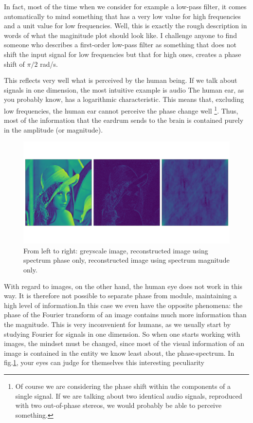 In fact, most of the time when we consider for example a low-pass filter, it comes automatically to mind something that has a very low value for 
high frequencies and a unit value for low frequencies. Well, this is exactly the rough description in words of what the maginitude plot should 
look like. I challenge anyone to find someone who describes a first-order low-pass filter as something that does not shift the input signal for 
low frequencies but that for high ones, creates a phase shift of $\pi/2$ rad/s.

This reflects very well what is perceived by the human being. If we talk about signals in one dimension, the most intuitive example is audio 
The human ear, as you probably know, has a logarithmic characteristic. This means that, excluding low frequencies, the human ear cannot 
perceive the phase change well \footnote{Of course we are considering the phase shift within the components of a single signal. 
If we are talking about two identical audio signals, reproduced with two out-of-phase stereos, we would probably be able to perceive something.}.
Thus, most of the information that the eardrum sends to the brain is contained purely in the amplitude (or magnitude).

\begin{figure}
  \centering
  \includegraphics[width=.95\textwidth]{papers/kugel/figures/python/phase_vs_abs.pdf}
  \caption{
    From left to right: greyscale image, reconstructed image using spectrum phase only, reconstructed image using spectrum magnitude only.
    \label{kugel:fig:2d-fourier-phasevsmagn}
  }
\end{figure}

With regard to images, on the other hand, the human eye does not work in this way. It is therefore not possible to separate phase from module, 
maintaining a high level of information.In this case we even have the opposite phenomena: the phase of the Fourier transform of an image contains 
much more information than the magnitude. This is very inconvenient for humans, as we usually start by studying Fourier for signals in one dimension. 
So when one starts working with images, the mindset must be changed, since most of the visual information of an image is contained in the entity 
we know least about, the phase-spectrum. In fig.\ref{kugel:fig:2d-fourier-phasevsmagn}, your eyes can judge for themselves this interesting peculiarity

